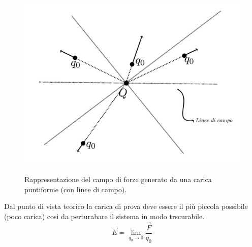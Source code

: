 \documentclass[11pt]{article}
\begin{document}
               \begin{center}
\begin{figure}[H]
			  \vspace{-10pt}
              \hspace{-90pt}
              ~~~~~~~~~~~~~~~~~~~~~~~~~~~~~~~~~~ \includegraphics[scale=0.22]{campocentrale}
               \caption{\small{Rappresentazione del campo di forze generato da una carica puntiforme (con linee di campo).}}
               \end{figure} 
               \end{center}
Dal punto di vista teorico la carica di prova deve essere il più piccola possibile (poco carica) così da perturabare il sistema in modo trscurabile.
$$\overrightarrow{E}=\lim_{q_0\rightarrow 0}\frac{\overrightarrow{F}}{q_0}$$
\end{document}
